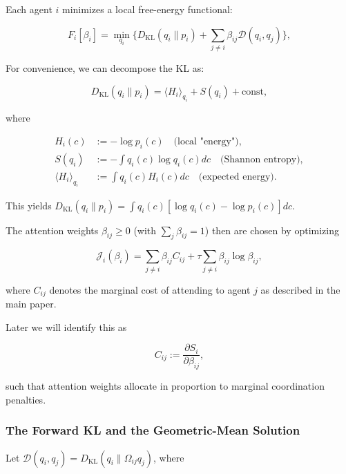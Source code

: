 \documentclass[twoside,11pt]{article}
\begin{document}
Each agent $i$ minimizes a local free-energy functional:

\begin{equation}
F_i[\beta_i]
=\min_{q_i}
\Big\{
D_{\mathrm{KL}}(q_i \| p_i)
+ \sum_{j\neq i} \beta_{ij} \mathcal{D}(q_i,q_j)
\Big\},
\label{eq:F_i_supp}
\end{equation}

For convenience, we can decompose the KL as:

\begin{equation}
D_{\mathrm{KL}}(q_i \| p_i) = \langle H_i \rangle_{q_i} + S(q_i) + \text{const},
\end{equation}

where

\begin{align}
H_i(c) &:= -\log p_i(c) \quad \text{(local "energy")}, \\
S(q_i) &:= -\int q_i(c) \log q_i(c) dc \quad \text{(Shannon entropy)}, \\
\langle H_i \rangle_{q_i} &:= \int q_i(c) H_i(c) dc \quad \text{(expected energy)}.
\end{align}

This yields $D_{\mathrm{KL}}(q_i \| p_i) = \int q_i(c)[\log q_i(c) - \log p_i(c)] dc$.

The attention weights $\beta_{ij}\ge 0$ (with $\sum_j \beta_{ij}=1$) then are chosen by optimizing

\begin{equation}
\mathcal{J}_i(\beta_i)
=\sum_{j\neq i}\beta_{ij} C_{ij}
+ \tau \sum_{j\neq i}\beta_{ij}\log\beta_{ij},
\label{eq:J_i_supp}
\end{equation}

where $C_{ij}$ denotes the marginal cost of attending to agent $j$ as described in the main paper.

Later we will identify this as

\begin{equation}
C_{ij} := \frac{\partial S_i}{\partial \beta_{ij}},
\end{equation}

such that attention weights allocate in proportion to marginal coordination penalties.

\subsubsection{The Forward KL and the Geometric-Mean Solution}
Let $\mathcal{D}(q_i,q_j) = D_{\mathrm{KL}}(q_i \| \Omega_{ij} q_j)$, where
\end{document}
